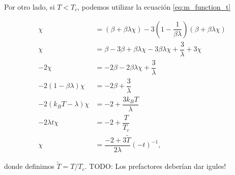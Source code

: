 \documentclass[10pt]{article}
\begin{document}
Por otro lado, si $T < T_c$, podemos utilizar la ecuaci\'on \ref{eq:m_function_t}

\begin{align}
\chi &= (\beta + \beta \lambda \chi) - 3 \left( 1 - \dfrac{1}{\beta \lambda} \right)(\beta + \beta \lambda \chi) \nonumber \\
\chi &= \beta - 3\beta  + \beta \lambda \chi - 3 \beta \lambda \chi + \dfrac{3}{\lambda} + 3\chi \nonumber \\
-2 \chi &= -2 \beta - 2\beta \lambda \chi + \dfrac{3}{\lambda} \nonumber \\
-2(1 - \beta \lambda ) \chi &= -2 \beta  + \dfrac{3}{\lambda} \nonumber \\
-2(k_B T -  \lambda ) \chi &= -2   + \dfrac{3k_B T}{\lambda} \nonumber \\
-2\lambda t \chi &= -2   + \dfrac{T}{T_c} \nonumber \\
\chi &= \dfrac{-2 + 3\tilde{T}}{2\lambda} (-t)^{-1},
\end{align}

donde definimos $\tilde{T} = T/T_c$. TODO: Los prefactores deber\'ian dar igules!
\end{document}
